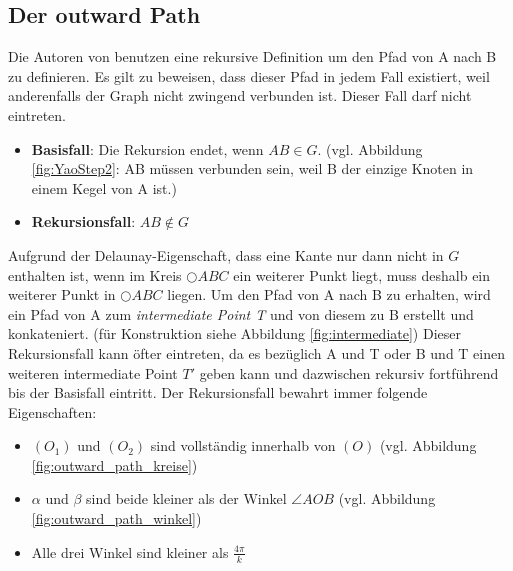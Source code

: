 \documentclass[a4paper,twoside]{IEEEtran}
\begin{document}
\subsection{Der outward Path}
Die Autoren von \cite{kanj} benutzen eine rekursive Definition um den Pfad von A nach B zu definieren.
Es gilt zu beweisen, dass dieser Pfad in jedem Fall existiert, weil anderenfalls der Graph nicht zwingend verbunden ist.
Dieser Fall darf nicht eintreten.

\begin{itemize}
\item \textbf{Basisfall}: Die Rekursion endet, wenn $AB \in G $. (vgl. Abbildung \ref{fig:YaoStep2}: AB müssen verbunden sein, weil B der einzige Knoten in einem Kegel von A ist.)
\item \textbf{Rekursionsfall}: $AB \notin G $
\end{itemize}

Aufgrund der Delaunay-Eigenschaft, dass eine Kante nur dann nicht in $G $ enthalten ist, wenn im Kreis $\bigcirc {ABC} $ ein weiterer Punkt liegt, muss deshalb ein weiterer Punkt in  $\bigcirc {ABC} $ liegen.
Um den Pfad von A nach B zu erhalten, wird ein Pfad von A zum \emph{intermediate Point T} und von diesem zu B erstellt und konkateniert. (für Konstruktion siehe Abbildung \ref{fig:intermediate})
Dieser Rekursionsfall kann öfter eintreten, da es bezüglich A und T oder B und T einen weiteren intermediate Point $T' $ geben kann und dazwischen rekursiv fortführend bis der Basisfall eintritt.
Der Rekursionsfall bewahrt immer folgende Eigenschaften:
\begin{itemize}
\item $(O_1) $ und $(O_2) $ sind vollständig innerhalb von $(O) $ (vgl. Abbildung \ref{fig:outward_path_kreise})
\item $\alpha $ und $\beta $ sind beide kleiner als der Winkel $\angle {AOB} $ (vgl. Abbildung \ref{fig:outward_path_winkel}) 
\item Alle drei Winkel sind kleiner als $\frac{4\pi}{k} $
\end{itemize}
\end{document}
